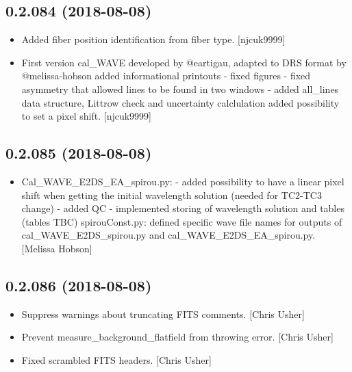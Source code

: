 \documentclass[a4paper,10pt,english]{report}
\begin{document}
\subsection{0.2.084 (2018-08-08)}
\label{\detokenize{misc/changelog:id376}}\begin{itemize}
\item {} 
Added fiber position identification from fiber type. {[}njcuk9999{]}

\item {} 
First version cal\_WAVE developed by @eartigau, adapted to DRS format
by @melissa-hobson added informational printouts - fixed figures -
fixed asymmetry that allowed lines to be found in two windows - added
all\_lines data structure, Littrow check and uncertainty calclulation
added possibility to set a pixel shift. {[}njcuk9999{]}

\end{itemize}


\subsection{0.2.085 (2018-08-08)}
\label{\detokenize{misc/changelog:id377}}\begin{itemize}
\item {} 
Cal\_WAVE\_E2DS\_EA\_spirou.py: - added possibility to have a linear pixel
shift when getting the initial wavelength solution (needed for TC2-TC3
change) - added QC - implemented storing of wavelength solution and
tables (tables TBC) spirouConst.py: defined specific wave file names
for outputs of cal\_WAVE\_E2DS\_spirou.py and cal\_WAVE\_E2DS\_EA\_spirou.py.
{[}Melissa Hobson{]}

\end{itemize}


\subsection{0.2.086 (2018-08-08)}
\label{\detokenize{misc/changelog:id378}}\begin{itemize}
\item {} 
Suppress warnings about truncating FITS comments. {[}Chris Usher{]}

\item {} 
Prevent measure\_background\_flatfield from throwing error. {[}Chris
Usher{]}

\item {} 
Fixed scrambled FITS headers. {[}Chris Usher{]}

\end{itemize}
\end{document}
